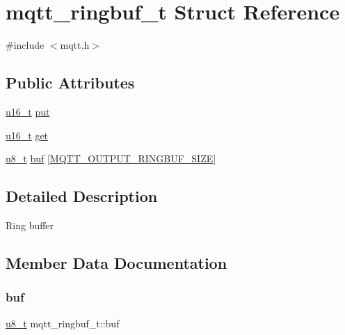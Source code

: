 \hypertarget{structmqtt__ringbuf__t}{}\section{mqtt\+\_\+ringbuf\+\_\+t Struct Reference}
\label{structmqtt__ringbuf__t}


{\ttfamily \#include $<$mqtt.\+h$>$}

\subsection*{Public Attributes}
\begin{DoxyCompactItemize}
\item 
\hyperlink{group__compiler__abstraction_ga77570ac4fcab86864fa1916e55676da2}{u16\+\_\+t} \hyperlink{structmqtt__ringbuf__t_af2d228ca682741a29621e9592536fa39}{put}
\item 
\hyperlink{group__compiler__abstraction_ga77570ac4fcab86864fa1916e55676da2}{u16\+\_\+t} \hyperlink{structmqtt__ringbuf__t_aa403cea9ffc2f3a780591bf8d5482054}{get}
\item 
\hyperlink{group__compiler__abstraction_ga4caecabca98b43919dd11be1c0d4cd8e}{u8\+\_\+t} \hyperlink{structmqtt__ringbuf__t_a971b7d8558b50936cc0d671f104a88c5}{buf} \mbox{[}\hyperlink{group__mqtt__opts_ga70627bafaffa071875cee9edc38d942b}{M\+Q\+T\+T\+\_\+\+O\+U\+T\+P\+U\+T\+\_\+\+R\+I\+N\+G\+B\+U\+F\+\_\+\+S\+I\+ZE}\mbox{]}
\end{DoxyCompactItemize}


\subsection{Detailed Description}
Ring buffer 

\subsection{Member Data Documentation}
\mbox{\label{structmqtt__ringbuf__t_a971b7d8558b50936cc0d671f104a88c5}} 
\subsubsection{\texorpdfstring{buf}{buf}}
{\footnotesize\ttfamily \hyperlink{group__compiler__abstraction_ga4caecabca98b43919dd11be1c0d4cd8e}{u8\+\_\+t} mqtt\+\_\+ringbuf\+\_\+t\+::buf}

